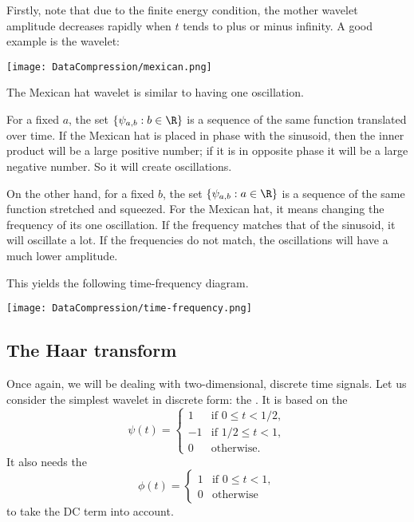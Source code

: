 Firstly, note that due to the finite energy condition, the mother wavelet amplitude decreases rapidly when $t$ tends to plus or minus infinity. A good example is the  wavelet:

\begin{center}
\texttt{[image: DataCompression/mexican.png]}
\end{center}

The Mexican hat wavelet is similar to having one oscillation.


For a fixed $a$, the set $\{ \psi_{a,b} : b \in \R \}$ is a sequence of the same function translated over time. If the Mexican hat is placed in phase with the sinusoid, then the inner product will be a large positive number; if it is in opposite phase it will be a large negative number. So it will create oscillations.

On the other hand, for a fixed $b$, the set $\{ \psi_{a,b} : a \in \R \}$ is a sequence of the same function stretched and squeezed. For the Mexican hat, it means changing the frequency of its one oscillation. If the frequency matches that of the sinusoid, it will oscillate a lot. If the frequencies do not match, the oscillations will have a much lower amplitude.

This yields the following time-frequency diagram.

\begin{center}
\texttt{[image: DataCompression/time-frequency.png]}
\end{center}

\subsection{The Haar transform}

Once again, we will be dealing with two-dimensional, discrete time signals. Let us consider the simplest wavelet in discrete form: the . It is based on the 
\[
    \psi(t) = \begin{cases}
    1 & \text{if } 0 \le t < 1/2,\\
    -1 & \text{if } 1/2 \le t < 1,\\
    0 & \text{otherwise.}
    \end{cases}
\]
It also needs the 
\[
    \phi(t) = \begin{cases}
    1 & \text{if } 0 \le t < 1,\\
    0 & \text{otherwise}
    \end{cases}
\]
to take the DC term into account.

